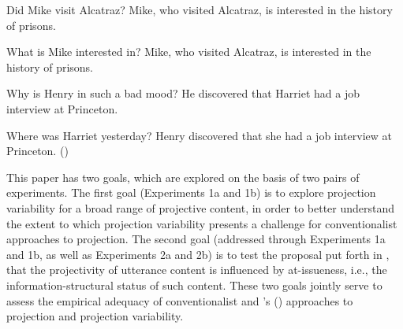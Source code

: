 \documentclass[11pt,fleqn]{article}
\newcommand{\6}{\mbox{$[\hspace*{-.6mm}[$}}
\newcommand{\9}{\mbox{$]\hspace*{-.6mm}]$}}
\def\infelic{{\leavevmode\llap{\#}}}
\newcommand{\citetpos}[1]{\citeauthor{#1}'s (\citeyear{#1})}
\begin{document}
\begin{exe}
\ex\label{nrrc}
\begin{xlist}
\ex
\begin{xlist}
 Did Mike visit Alcatraz?
 \infelic Mike, who visited Alcatraz, is interested in the history of prisons.
\end{xlist}


\ex
\begin{xlist}
 What is Mike interested in?
 Mike, who visited Alcatraz, is interested in the history of prisons.
\end{xlist}


\end{xlist}

\ex\label{discover}
\begin{xlist}

\ex
\begin{xlist}
 Why is Henry in such a bad mood?
 He discovered that Harriet had a job interview at Princeton. 
\end{xlist}

\ex
\begin{xlist}
 Where was Harriet yesterday?
 Henry discovered that she had a job interview at Princeton. \hfill (\citealt[1035]{simons07})
\end{xlist}
\end{xlist}
\end{exe}

This paper has two goals, which are explored on the basis of two pairs of experiments. The first goal (Experiments 1a and 1b) is to explore projection variability for a broad range of projective content, in order to better understand the extent to which projection variability presents a challenge for conventionalist approaches to projection. The second goal (addressed through Experiments 1a and 1b, as well as Experiments 2a and 2b) is to test the proposal put forth in \citealt{brst-salt10}, that the projectivity of utterance content is influenced by at-issueness, i.e., the information-structural status of such content. These two goals jointly serve to assess the empirical adequacy of conventionalist and \citetpos{brst-salt10} approaches to projection and projection variability.
\end{document}
